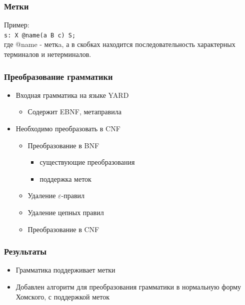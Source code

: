 \documentclass{beamer}
\begin{document}
\begin{frame}[fragile]
	\transwipe[direction=90]
	\frametitle{Метки}
	Пример:
	\\
	\verb|s: X @name(a B c) S;|
	\\
	где @name - меткa, а в скобках находится последовательность характерных терминалов и нетерминалов.
\end{frame}

\begin{frame}
	\transwipe[direction=90]
	\frametitle{Преобразование грамматики}
	\begin{itemize}
	    \item Входная грамматика на языке YARD
	    \begin{itemize}
	        \item Содержит EBNF, метаправила
        \end{itemize}
        \item Необходимо преобразовать в CNF
        \begin{itemize}
            \item Преобразование в BNF
            \begin{itemize}
                \item существующие преобразования
                \item поддержка меток
            \end{itemize}
            \item Удаление $\varepsilon$-правил
            \item Удаление цепных правил
            \item Преобразование в CNF
        \end{itemize}
    \end{itemize}
\end{frame}    

\begin{frame}
	\transwipe[direction=90]
	\frametitle{Результаты}
	\begin{itemize}
        \item Грамматика поддерживает метки
        \item Добавлен алгоритм для преобразования грамматики в нормальную форму Хомского, с поддержкой меток
    \end{itemize}    
\end{frame}    

\end{document}
